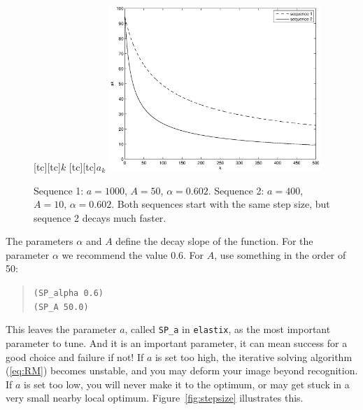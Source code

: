 \documentclass[]{report}
\newcommand{\elastix}{\texttt{elastix}}
\begin{document}
\begin{figure}
\centering {}[tc][tc]{$k$} [tc][tc]{$a_k$}
\includegraphics[width=8cm]{ak.eps}
\caption{Sequence 1: $a = 1000$, $A = 50$, $\alpha = 0.602$.
Sequence 2: $a = 400$, $A = 10$, $\alpha = 0.602$. Both sequences
start with the same step size, but sequence 2 decays much
faster.}\label{fig:ak}
\end{figure}
The parameters $\alpha$ and $A$ define the decay slope of the
function. For the parameter $\alpha$ we recommend the value 0.6.
For $A$, use something in the order of 50:
\begin{quote}
\texttt{(SP\_alpha 0.6)} \\
\texttt{(SP\_A 50.0)}
\end{quote}
This leaves the parameter $a$, called \texttt{SP\_a} in \elastix,
as the most important parameter to tune. And it is an important
parameter, it can mean success for a good choice and failure if
not! If $a$ is set too high, the iterative solving algorithm
(\ref{eq:RM}) becomes unstable, and you may deform your image
beyond recognition. If $a$ is set too low, you will never make it
to the optimum, or may get stuck in a very small nearby local
optimum. Figure~\ref{fig:stepsize} illustrates this.
\end{document}
